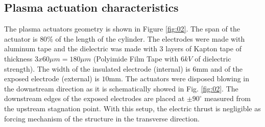 \documentclass[review]{elsarticle}
\begin{document}
\subsection*{Plasma actuation characteristics}

The plasma actuators geometry is shown in  Figure \ref{fig:02}. The span of the actuator is $80\%$ of the length of the cylinder. The electrodes were made with aluminum tape and the dielectric was made with $3$ layers of Kapton tape of thickness $3 x 60\mu m = 180\mu m$ (Polyimide Film Tape with $6kV$ of dielectric strength). The width of the insulated electrode (internal) is $6$mm and of the exposed electrode (external) is $10$mm. The actuators were disposed blowing in the downstream direction as it is schematically showed in Fig. \ref{fig:02}. The downstream edges of the exposed electrodes are placed at $\pm 90^\circ$ measured from the upstream stagnation point. With this setup, the electric thrust is negligible as forcing mechanism of the structure in the transverse direction. 
\end{document}
